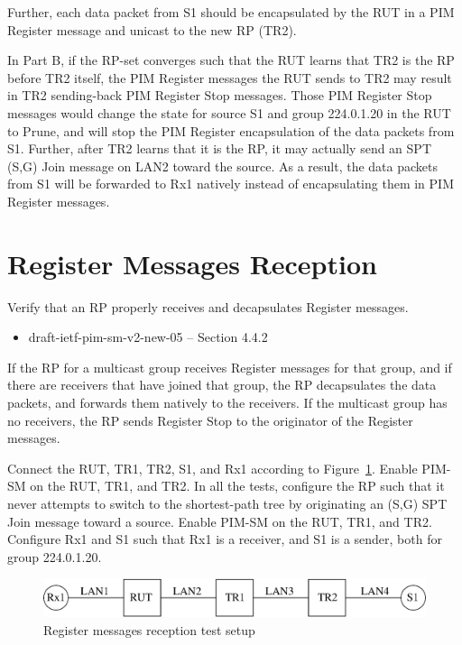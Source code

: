 \documentclass[11pt]{report}
\begin{document}
\begin{itemize}
  Further, each data packet from S1 should be encapsulated by the RUT in a PIM
  Register message and unicast to the new RP (TR2).

\end{itemize}


In Part B, if the RP-set converges such that the RUT learns that TR2 is the RP
before TR2 itself, the PIM Register messages the RUT sends to TR2 may result
in TR2 sending-back PIM Register Stop messages. Those PIM Register Stop
messages would change the state for source S1 and group 224.0.1.20 in the RUT
to Prune, and will stop the PIM Register encapsulation of the data packets
from S1. Further, after TR2 learns that it is the RP, it may actually send an
SPT (S,G) Join message on LAN2 toward the source. As a result, the data
packets from S1 will be forwarded to Rx1 natively instead of encapsulating
them in PIM Register messages.

\newpage
\section{Register Messages Reception}

Verify that an RP properly receives and decapsulates Register messages.

\begin{itemize}
  \item draft-ietf-pim-sm-v2-new-05 -- Section 4.4.2
\end{itemize}

If the RP for a multicast group receives Register messages for that group,
and if there are receivers that have joined that group, the RP decapsulates
the data packets, and forwards them natively to the receivers. If the
multicast group has no receivers, the RP sends Register Stop to the originator
of the Register messages.

Connect the RUT, TR1, TR2, S1, and Rx1 according to
Figure~\ref{fig:register_messages_reception}.
Enable PIM-SM on the RUT,
TR1, and TR2. In all the tests, configure the RP such that it never attempts to
switch to the shortest-path tree by originating an (S,G) SPT Join message
toward a source. Enable PIM-SM on the RUT, TR1, and TR2.  Configure Rx1 and S1
such that Rx1 is a receiver, and S1 is a sender, both for group 224.0.1.20.


\begin{figure}[htbp]
  \begin{center}
    \includegraphics[scale=0.8]{figs/pim_test_3_3_register_messages_reception}
    \caption{Register messages reception test setup}
    \label{fig:register_messages_reception}
  \end{center}
\end{figure}
\end{document}
